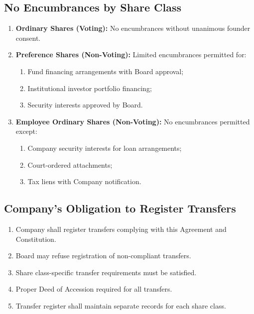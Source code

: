\subsection{No Encumbrances by Share Class}
\begin{enumerate}[label=(\alph*)]
\item \textbf{Ordinary Shares (Voting):} No encumbrances without unanimous founder consent.
\item \textbf{Preference Shares (Non-Voting):} Limited encumbrances permitted for:
    \begin{enumerate}[label=(\roman*)]
    \item Fund financing arrangements with Board approval;
    \item Institutional investor portfolio financing;
    \item Security interests approved by Board.
    \end{enumerate}
\item \textbf{Employee Ordinary Shares (Non-Voting):} No encumbrances permitted except:
    \begin{enumerate}[label=(\roman*)]
    \item Company security interests for loan arrangements;
    \item Court-ordered attachments;
    \item Tax liens with Company notification.
\end{enumerate}
\end{enumerate}

\subsection{Company's Obligation to Register Transfers}
\begin{enumerate}[label=(\alph*)]
\item Company shall register transfers complying with this Agreement and Constitution.
\item Board may refuse registration of non-compliant transfers.
\item Share class-specific transfer requirements must be satisfied.
\item Proper Deed of Accession required for all transfers.
\item Transfer register shall maintain separate records for each share class.
\end{enumerate}
